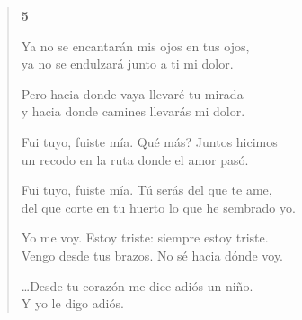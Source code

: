 \documentclass[12pt]{article}
\begin{document}
\begin{verse}
{\bfseries\scshape {5}}

Ya no se encantarán mis ojos en tus ojos,\\
ya no se endulzará junto a ti mi dolor.  

Pero hacia donde vaya llevaré tu mirada\\
y hacia donde camines llevarás mi dolor.  

Fui tuyo, fuiste mía. Qué más? Juntos hicimos\\
un recodo en la ruta donde el amor pasó.  

Fui tuyo, fuiste mía. Tú serás del que te ame,\\
del que corte en tu huerto lo que he sembrado yo.  

Yo me voy. Estoy triste: siempre estoy triste.\\
Vengo desde tus brazos. No sé hacia dónde voy.  

\ldots{}Desde tu corazón me dice adiós un niño.\\
Y yo le digo adiós.

\end{verse}
\end{document}
